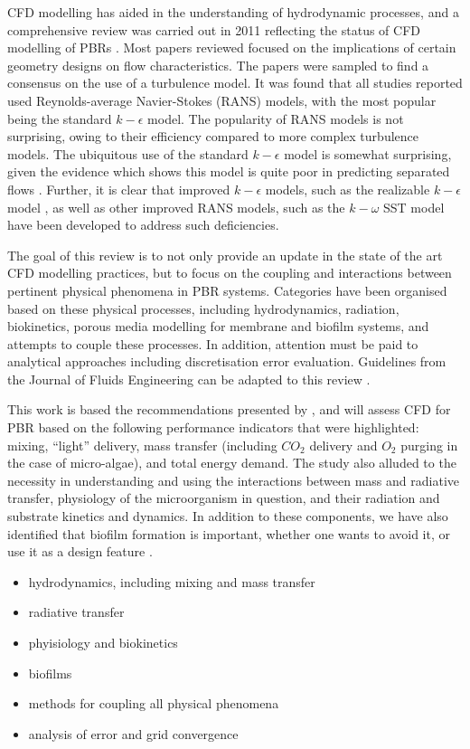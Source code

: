 CFD modelling has aided in the understanding of hydrodynamic processes, and a comprehensive review was carried out in 2011 reflecting the status of CFD modelling of PBRs \cite{Bitog2011}. Most papers reviewed focused on the implications of certain geometry designs on flow characteristics. The papers were sampled to find a consensus on the use of a turbulence model. It was found that all studies reported used Reynolds-average Navier-Stokes (RANS) models, with the most popular being the standard $k-\epsilon$ model. The popularity of RANS models is not surprising, owing to their efficiency compared to more complex turbulence models.  The ubiquitous use of the standard $k-\epsilon$ model is somewhat surprising, given the evidence which shows this model is quite poor in predicting separated flows \cite{Menter2003}. Further, it is clear that improved $k-\epsilon$ models, such as the realizable $k-\epsilon$ model \cite{Shih1995}, as well as other improved RANS models, such as the $k-\omega$  SST model \cite{Menter1994,Menter2003} have been developed to address such deficiencies.
\skippingparagraph

The goal of this review is to not only provide an update in the state of the art CFD modelling practices, but to focus on the coupling and interactions between pertinent physical phenomena in PBR systems. Categories have been organised based on these physical processes, including hydrodynamics, radiation, biokinetics, porous media modelling for membrane and biofilm systems, and attempts to couple these processes. In addition, attention must be paid to analytical approaches including discretisation error evaluation. Guidelines from the Journal of Fluids Engineering can be adapted to this review \cite{Celik2008}.
\skippingparagraph

This work is based the recommendations presented by \cite{Posten2009}, and will assess CFD for PBR based on the following performance indicators that were highlighted: mixing, ``light'' delivery, mass transfer (including $CO_2$ delivery and $O_2$ purging in the case of micro-algae), and total energy demand. The study also alluded to the necessity in understanding and using the interactions between mass and radiative transfer, physiology of the microorganism in question, and their radiation and substrate kinetics and dynamics. In addition to these components, we have also identified that biofilm formation is important, whether one wants to avoid it, or use it as a design feature \cite{Castro2017}.

\begin{itemize}
\item hydrodynamics, including mixing and mass transfer
\item radiative transfer
\item phyisiology and biokinetics
\item biofilms
\item methods for coupling all physical phenomena
\item analysis of error and grid convergence
\end{itemize}

